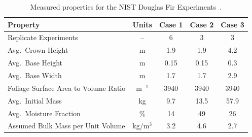 \begin{table}[ht]
\begin{center}
\caption[Measured properties for the NIST Douglas Fir Experiments]{Measured properties for the NIST Douglas Fir Experiments~\cite{Mell:2009}.}
\label{Properties_Trees}
\begin{tabular}{|l|c|c|c|c|}
\hline
Property                                & Units         & Case 1        & Case 2        & Case 3     \\ \hline \hline
Replicate Experiments                   & --            & 6             & 3             & 3          \\ \hline
Avg.~Crown Height                       & m             & 1.9           & 1.9           & 4.2        \\ \hline
Avg.~Base Height                        & m             & 0.15          & 0.15          & 0.3        \\ \hline
Avg.~Base Width                         & m             & 1.7           & 1.7           & 2.9        \\ \hline
Foliage Surface Area to Volume Ratio    & m$^{-1}$      & 3940          & 3940          & 3940       \\ \hline
Avg.~Initial Mass                       & kg            & 9.7           & 13.5          & 57.9       \\ \hline
Avg.~Moisture Fraction                  & \%            & 14            & 49            & 26         \\ \hline
Assumed Bulk Mass per Unit Volume       & kg/m$^3$      & 3.2           & 4.6           & 2.7        \\ \hline
\end{tabular}
\end{center}
\end{table}

